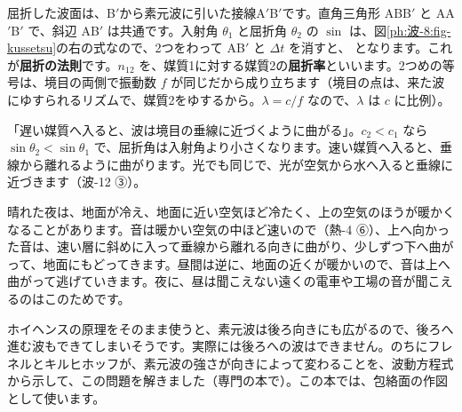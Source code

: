 \noindent 屈折した波面は、B$'$から素元波に引いた接線A$'$B$'$です。直角三角形 ABB$'$ と AA$'$B$'$ で、斜辺 AB$'$ は共通です。入射角 $\theta_1$ と屈折角 $\theta_2$ の $\sin$ は、図\ref{ph:波-8:fig-kussetsu}の右の式なので、2つをわって AB$'$ と $\Delta t$ を消すと、
\label{ph:波-8:kussetsu}となります。これが\textbf{屈折の法則}です。$n_{12}$ を、媒質1に対する媒質2の\textbf{屈折率}といいます。2つめの等号は、境目の両側で振動数 $f$ が同じだから成り立ちます（境目の点は、来た波にゆすられるリズムで、媒質2をゆするから。$\lambda=c/f$ なので、$\lambda$ は $c$ に比例）。

\begin{phflow}[ホイヘンスの原理から]
\end{phflow}

\begin{phyomi}[$\dfrac{\sin\theta_1}{\sin\theta_2}=\dfrac{c_1}{c_2}$]
「遅い媒質へ入ると、波は境目の垂線に近づくように曲がる」。$c_2<c_1$ なら $\sin\theta_2<\sin\theta_1$ で、屈折角は入射角より小さくなります。速い媒質へ入ると、垂線から離れるように曲がります。光でも同じで、光が空気から水へ入ると垂線に近づきます（波-12 ③）。
\end{phyomi}

\begin{phmijika}[夜は、遠くの電車の音がよく聞こえる]
晴れた夜は、地面が冷え、地面に近い空気ほど冷たく、上の空気のほうが暖かくなることがあります。音は暖かい空気の中ほど速いので（熱-4 ⑥）、上へ向かった音は、速い層に斜めに入って垂線から離れる向きに曲がり、少しずつ下へ曲がって、地面にもどってきます。昼間は逆に、地面の近くが暖かいので、音は上へ曲がって逃げていきます。夜に、昼は聞こえない遠くの電車や工場の音が聞こえるのはこのためです。
\end{phmijika}

\begin{seikaku}
ホイヘンスの原理をそのまま使うと、素元波は後ろ向きにも広がるので、後ろへ進む波もできてしまいそうです。実際には後ろへの波はできません。のちにフレネルとキルヒホッフが、素元波の強さが向きによって変わることを、波動方程式から示して、この問題を解きました（専門の本で）。この本では、包絡面の作図として使います。
\end{seikaku}

